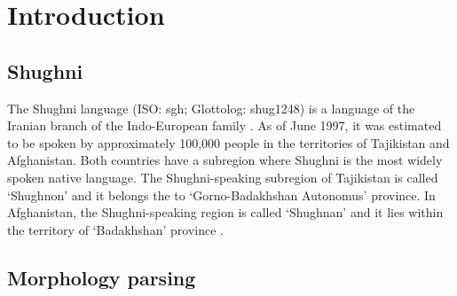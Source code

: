 \section{Introduction}

\subsection{Shughni}
The Shughni language (ISO: sgh; Glottolog: shug1248) is a language of the Iranian branch of the Indo-European family \parencite[12]{plungian_study_2022}. As of June 1997, it was estimated to be spoken by approximately 100,000 people \parencite[225]{edelman_languages_1999}  in the territories of Tajikistan and Afghanistan. Both countries have a subregion where Shughni is the most widely spoken native language. The Shughni-speaking subregion of Tajikistan is called `Shughnon' and it belongs the to `Gorno-Badakhshan Autonomus' province. In Afghanistan, the Shughni-speaking region is called `Shughnan' and it lies within the territory of `Badakhshan' province \parencite[2]{parker_shughni_2023}.

\subsection{Morphology parsing }